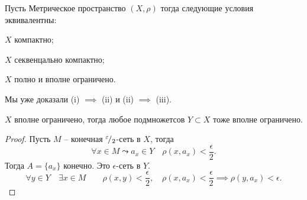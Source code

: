 \begin{theorem}
    Пусть Метрическое пространство $(X, \rho)$ тогда следующие условия эквивалентны: \begin{conditions}
        \item $X$ компактно;
        \item $X$ секвенцально компактно;
        \item $X$ полно и вполне ограничено.
    \end{conditions}
\end{theorem}
\begin{remark}
    Мы уже доказали (i) $\implies$ (ii) и (ii) $\implies$ (iii).
\end{remark}
\begin{lemma}
    $X$ вполне ограничено, тогда любое подмножетсов $Y \subset X$ тоже вполне ограничено.
\end{lemma}
\begin{proof}
    Пусть $M$ -- конечная ${}^{\varepsilon}\!/_{2}$-сеть в $X$, тогда $$\forall x \in M \leadsto a_x\in Y\quad\rho(x, a_x) < \frac \epsilon 2.$$
    Тогда $A = \{a_x\}$ конечно. Это $\epsilon$-сеть в $Y.$ \[\forall y \in Y \quad \exists x \in M\qquad \rho(x, y) < \frac \epsilon 2, \quad \rho(x, a_x) < \frac \epsilon 2 \implies \rho(y, a_x) < \epsilon.\]
\end{proof}